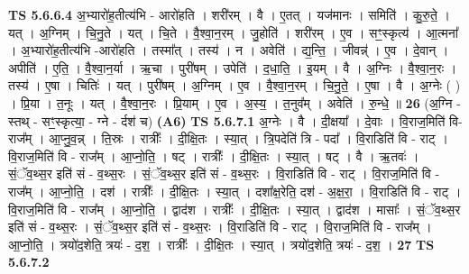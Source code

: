 \documentclass[17pt]{extarticle}
\begin{document}
                  \newline
                                \textbf{ TS 5.6.6.4} \newline
                  अ॒भ्यारो॑ह॒तीत्य॑भि - आरो॑हति । शरी॑रम् । वै । ए॒तत् । यज॑मानः । समिति॑ । कु॒रु॒ते॒ । यत् । अ॒ग्निम् । चि॒नु॒ते । यत् । चि॒ते । वै॒श्वा॒न॒रम् । जु॒होति॑ । शरी॑रम् । ए॒व । सꣳ॒॒स्कृत्य॑ । आ॒त्मना᳚ । अ॒भ्यारो॑ह॒तीत्य॑भि -आरो॑हति । तस्मा᳚त् । तस्य॑ । न । अवेति॑ । द्य॒न्ति॒ । जीवन्न्॑ । ए॒व । दे॒वान् । अपीति॑ । ए॒ति॒ । वै॒श्वा॒न॒र्या । ऋ॒चा । पुरी॑षम् । उपेति॑ । द॒धा॒ति॒ । इ॒यम् । वै । अ॒ग्निः । वै॒श्वा॒न॒रः । तस्य॑ । ए॒षा । चितिः॑ । यत् । पुरी॑षम् । अ॒ग्निम् । ए॒व । वै॒श्वा॒न॒रम् । चि॒नु॒ते॒ । ए॒षा । वै । अ॒ग्नेः ( ) । प्रि॒या । त॒नूः । यत् । वै॒श्वा॒न॒रः । प्रि॒याम् । ए॒व । अ॒स्य॒ । त॒नुव᳚म् । अवेति॑ । रु॒न्धे॒ ॥ \textbf{  26} \newline
                  \newline
                      (अ॒ग्नि - स्तथ् - सꣳ॒॒स्कृत्या॒ - ग्ने - र्दश॑ च)  \textbf{(A6)} \newline \newline
                                \textbf{ TS 5.6.7.1} \newline
                  अ॒ग्नेः । वै । दी॒क्षया᳚ । दे॒वाः । वि॒राज॒मिति॑ वि-राज᳚म् । आ॒प्नु॒व॒न्न् । ति॒स्रः । रात्रीः᳚ । दी॒क्षि॒तः । स्या॒त् । त्रि॒पदेति॑ त्रि - पदा᳚ । वि॒राडिति॑ वि - राट् । वि॒राज॒मिति॑ वि - राज᳚म् । आ॒प्नो॒ति॒ । षट् । रात्रीः᳚ । दी॒क्षि॒तः । स्या॒त् । षट् । वै । ऋ॒तवः॑ । सं॒ॅव॒थ्स॒र इति॑ सं - व॒थ्स॒रः । सं॒ॅव॒थ्स॒र इति॑ सं - व॒थ्स॒रः । वि॒राडिति॑ वि - राट् । वि॒राज॒मिति॑ वि - राज᳚म् । आ॒प्नो॒ति॒ । दश॑ । रात्रीः᳚ । दी॒क्षि॒तः । स्या॒त् । दशा᳚क्ष॒रेति॒ दश॑ - अ॒क्ष॒रा॒ । वि॒राडिति॑ वि - राट् । वि॒राज॒मिति॑ वि - राज᳚म् । आ॒प्नो॒ति॒ । द्वाद॑श । रात्रीः᳚ । दी॒क्षि॒तः । स्या॒त् । द्वाद॑श । मासाः᳚ । सं॒ॅव॒थ्स॒र इति॑ सं - व॒थ्स॒रः । सं॒ॅव॒थ्स॒र इति॑ सं - व॒थ्स॒रः । वि॒राडिति॑ वि - राट् । वि॒राज॒मिति॑ वि - राज᳚म् । आ॒प्नो॒ति॒ । त्रयो॑द॒शेति॒ त्रयः॑ - द॒श॒ । रात्रीः᳚ । दी॒क्षि॒तः । स्या॒त् । त्रयो॑द॒शेति॒ त्रयः॑ - द॒श॒ । \textbf{  27} \newline
                  \newline
                                \textbf{ TS 5.6.7.2} \newline
\end{document}

